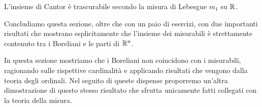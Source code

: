 \begin{exercise}\label{ex:CantorTrascurabile}
	L'insieme di Cantor è trascurabile secondo la misura di Lebesgue $m_1$ su $\mathbb R$.
\end{exercise}

Concludiamo questa sezione, oltre che con un paio di esercizi, con due importanti risultati che mostrano esplicitamente che l'insieme dei misurabili è strettamente contenuto tra i Boreliani e le parti di $\mathbb R^n$.

In questa sezione mostriamo che i Boreliani non coincidono con i misurabili, ragionando sulle rispettive cardinalità e applicando risultati che vengono dalla teoria degli ordinali. Nel seguito di queste dispense proporremo un'altra dimostrazione di questo stesso risultato che sfrutta unicamente fatti collegati con la teoria della misura.

